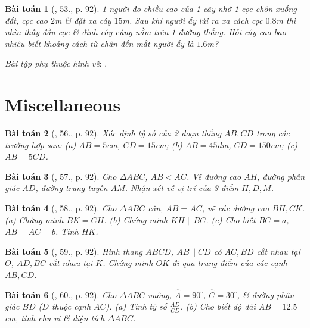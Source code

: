 \documentclass{article}
\newtheorem{baitoan}{Bài toán}
\begin{document}
\begin{baitoan}[\cite{SGK_Toan_8_tap_2}, 53., p. 92]
	1  người đo chiều cao của 1 cây nhờ 1 cọc chôn xuống đất, cọc cao $2$\emph{m} \& đặt xa cây $15$\emph{m}. Sau khi người ấy lùi ra xa cách cọc $0.8$\emph{m} thì nhìn thấy đầu cọc \& đỉnh cây cùng nằm trên 1 đường thẳng. Hỏi cây cao bao nhiêu biết khoảng cách từ chân đến mắt người ấy là $1.6$\emph{m}?
\end{baitoan}
\noindent\textit{Bài tập phụ thuộc hình vẽ}: \cite[54.--55., p. 87]{SGK_Toan_8_tap_2}.


\section{Miscellaneous}

\begin{baitoan}[\cite{SGK_Toan_8_tap_2}, 56., p. 92]
	Xác định tỷ số của 2 đoạn thẳng $AB,CD$ trong các trường hợp sau: (a) $AB = 5$\emph{cm}, $CD = 15$\emph{cm}; (b) $AB = 45$\emph{dm}, $CD = 150$\emph{cm}; (c) $AB = 5CD$.
\end{baitoan}

\begin{baitoan}[\cite{SGK_Toan_8_tap_2}, 57., p. 92]
	Cho $\Delta ABC$, $AB < AC$. Vẽ đường cao $AH$, đường phân giác $AD$, đường trung tuyến $AM$. Nhận xét về vị trí của 3 điểm $H,D,M$.
\end{baitoan}

\begin{baitoan}[\cite{SGK_Toan_8_tap_2}, 58., p. 92]
	Cho $\Delta ABC$ cân, $AB = AC$, vẽ các đường cao $BH,CK$. (a) Chứng minh $BK = CH$. (b) Chứng minh $KH\parallel BC$. (c) Cho biết $BC = a$, $AB = AC = b$. Tính $HK$.
\end{baitoan}

\begin{baitoan}[\cite{SGK_Toan_8_tap_2}, 59., p. 92]
	Hình thang $ABCD$, $AB\parallel CD$ có $AC,BD$ cắt nhau tại $O$, $AD,BC$ cắt nhau tại $K$. Chứng minh $OK$ đi qua trung điểm của các cạnh $AB,CD$.
\end{baitoan}

\begin{baitoan}[\cite{SGK_Toan_8_tap_2}, 60., p. 92]
	Cho $\Delta ABC$ vuông, $\widehat{A} = 90^\circ$, $\widehat{C} = 30^\circ$, \& đường phân giác $BD$ ($D$ thuộc cạnh $AC$). (a) Tính tỷ số $\frac{AD}{CD}$. (b) Cho biết độ dài $AB = 12.5$\emph{cm}, tính chu vi \& diện tích $\Delta ABC$.
\end{baitoan}
\end{document}
